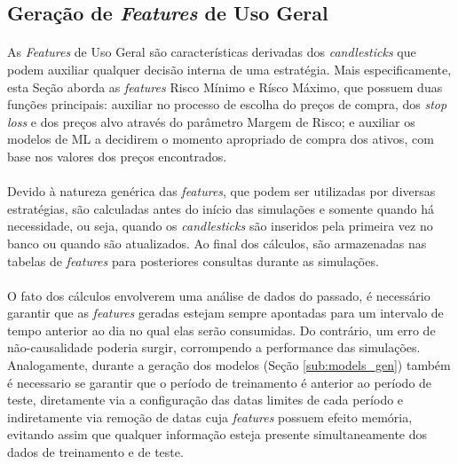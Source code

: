 \FloatBarrier
\subsection{Geração de \textit{Features} de Uso Geral}
\label{sub:features}

\paragraph{} As \textit{Features} de Uso Geral são características derivadas dos \textit{candlesticks} que podem auxiliar qualquer decisão interna de uma estratégia. Mais especificamente, esta Seção aborda as \textit{features} Risco Mínimo e Rísco Máximo, que possuem duas funções principais: auxiliar no processo de escolha do preços de compra, dos \textit{stop loss} e dos preços alvo através do parâmetro Margem de Risco; e auxiliar os modelos de ML a decidirem o momento apropriado de compra dos ativos, com base nos valores dos preços encontrados.

\paragraph{} Devido à natureza genérica das \textit{features}, que podem ser utilizadas por diversas estratégias, são calculadas antes do início das simulações e somente quando há necessidade, ou seja, quando os \textit{candlesticks} são inseridos pela primeira vez no banco ou quando são atualizados. Ao final dos cálculos, são armazenadas nas tabelas de \textit{features} para posteriores consultas durante as simulações.

\paragraph{} O fato dos cálculos envolverem uma análise de dados do passado, é necessário garantir que as \textit{features} geradas estejam sempre apontadas para um intervalo de tempo anterior ao dia no qual elas serão consumidas. Do contrário, um erro de não-causalidade poderia surgir, corrompendo a performance das simulações. Analogamente, durante a geração dos modelos (Seção \ref{sub:models_gen}) também é necessario se garantir que o período de treinamento é anterior ao período de teste, diretamente via a configuração das datas limites de cada período e indiretamente via remoção de datas cuja \textit{features} possuem efeito memória, evitando assim que qualquer informação esteja presente simultaneamente dos dados de treinamento e de teste.

